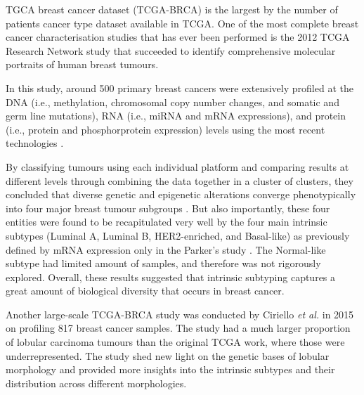     TGCA breast cancer dataset (TCGA-BRCA) is the largest by the number of patients cancer type dataset available in TCGA. One of the most complete breast cancer characterisation studies that has ever been performed is the 2012 TCGA Research Network study \cite{CancerGenomeAtlasNetwork2012ComprehensiveTumours} that succeeded to identify comprehensive molecular portraits of human breast tumours. 
    
    In this study, around 500 primary breast cancers were extensively profiled at the DNA (i.e., methylation, chromosomal copy number changes, and somatic and germ line mutations), RNA (i.e., miRNA and mRNA expressions), and protein (i.e., protein and phosphorprotein expression) levels using the most recent technologies \cite{CancerGenomeAtlasNetwork2012ComprehensiveTumours, Vidal2017}.
    
    By classifying tumours using each individual platform and comparing results at different levels through combining the data together in a cluster of clusters, they concluded that diverse genetic and epigenetic alterations converge phenotypically into four major breast tumour subgroups \cite{CancerGenomeAtlasNetwork2012ComprehensiveTumours}. But also importantly, these four entities were found to be recapitulated very well by the four main intrinsic subtypes (Luminal A, Luminal B, HER2-enriched, and Basal-like) as previously defined by mRNA expression only in the Parker’s study \cite{ParkerSupervisedSubtypes}. The Normal-like subtype had limited amount of samples, and therefore was not rigorously explored. Overall, these results suggested that intrinsic subtyping captures a great amount of biological diversity that occurs in breast cancer. 
    
    Another large-scale TCGA-BRCA study was conducted by Ciriello \textit{et al.} in 2015 \cite{Ciriello2015ComprehensiveCancer} on profiling 817 breast cancer samples. The study had a much larger proportion of lobular carcinoma tumours than the original TCGA work, where those were underrepresented. The study shed new light on the genetic bases of lobular morphology and provided more insights into the intrinsic subtypes and their distribution across different morphologies. 
    
    
    
   
    
    
    
    




    
    
